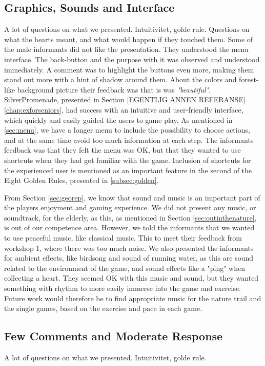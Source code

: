 \subsection{Graphics, Sounds and Interface}
A lot of questions on what we presented. Intuitivitet, golde rule.
Questions on what the hearts meant, and what would happen if they touched them. Some of the male informants did not like the presentation. 
They understood the menu interface. The back-button and the purpose with it was observed and understood immediately. A comment was to highlight the buttons even more, making them stand out more with a hint of shadow around them. About the colors and forest-like background picture their feedback was that is was \emph{"beautiful"}. SilverPromenade, presented in Section [EGENTLIG ANNEN REFERANSE] \ref{chap:exforseniors}, had success with an intuitive and user-friendly interface, which quickly and easily guided the users to game play. As mentioned in \ref{sec:menu}, we have a longer menu to include the possibility to choose actions, and at the same time avoid too much information at each step. The informants feedback was that they felt the menu was OK, but that they wanted to use shortcuts when they had got familiar with the game. Inclusion of shortcuts for the experienced user is mentioned as an important feature in the second of the Eight Golden Rules, presented in \ref{subsec:golden}.

From Section \ref{sec:georep}, we know that sound and music is an important part of the players enjoyment and gaming experience. We did not present any music, or soundtrack, for the elderly, as this, as mentioned in Section \ref{sec:outinthenature}, is out of our competence area. However, we told the informants that we wanted to use peaceful music, like classical music. This to meet their feedback from workshop 1, where there was too much noise. We also presented the informants for ambient effects, like birdsong and sound of running water, as this are sound related to the environment of the game, and sound effects like a "ping" when collecting a heart. They seemed OK with this music and sound, but they wanted something with rhythm to more easily immerse into the game and exercise. Future work would therefore be to find appropriate music for the nature trail and the single games, based on the exercise and pace in each game. 
  
\subsection{Few Comments and Moderate Response}
A lot of questions on what we presented. Intuitivitet, golde rule. 
